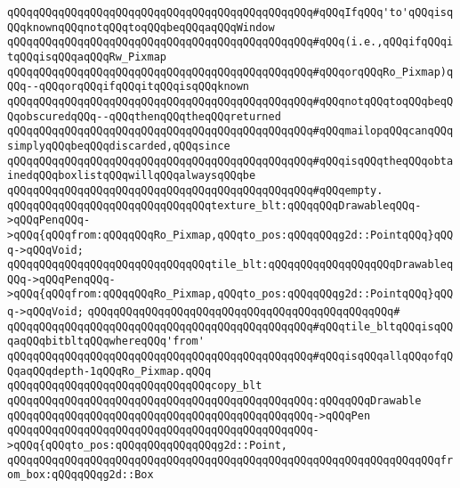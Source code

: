 \verb|qQQqqQQqqQQqqQQqqQQqqQQqqQQqqQQqqQQqqQQqqQQqqQQq#qQQqIfqQQq'to'qQQqisqQQqknownqQQqnotqQQqtoqQQqbeqQQqaqQQqWindow|\newline
\verb|qQQqqQQqqQQqqQQqqQQqqQQqqQQqqQQqqQQqqQQqqQQqqQQq#qQQq(i.e.,qQQqifqQQqitqQQqisqQQqaqQQqRw_Pixmap|\newline
\verb|qQQqqQQqqQQqqQQqqQQqqQQqqQQqqQQqqQQqqQQqqQQqqQQq#qQQqorqQQqRo_Pixmap)qQQq--qQQqorqQQqifqQQqitqQQqisqQQqknown|\newline
\verb|qQQqqQQqqQQqqQQqqQQqqQQqqQQqqQQqqQQqqQQqqQQqqQQq#qQQqnotqQQqtoqQQqbeqQQqobscuredqQQq--qQQqthenqQQqtheqQQqreturned|\newline
\verb|qQQqqQQqqQQqqQQqqQQqqQQqqQQqqQQqqQQqqQQqqQQqqQQq#qQQqmailopqQQqcanqQQqsimplyqQQqbeqQQqdiscarded,qQQqsince|\newline
\verb|qQQqqQQqqQQqqQQqqQQqqQQqqQQqqQQqqQQqqQQqqQQqqQQq#qQQqisqQQqtheqQQqobtainedqQQqboxlistqQQqwillqQQqalwaysqQQqbe|\newline
\verb|qQQqqQQqqQQqqQQqqQQqqQQqqQQqqQQqqQQqqQQqqQQqqQQq#qQQqempty.|\newline
\newline
\newline
\verb|qQQqqQQqqQQqqQQqqQQqqQQqqQQqqQQqtexture_blt:qQQqqQQqDrawableqQQq->qQQqPenqQQq->qQQq{qQQqfrom:qQQqqQQqRo_Pixmap,qQQqto_pos:qQQqqQQqg2d::PointqQQq}qQQq->qQQqVoid;|\newline
\verb|qQQqqQQqqQQqqQQqqQQqqQQqqQQqqQQqtile_blt:qQQqqQQqqQQqqQQqqQQqDrawableqQQq->qQQqPenqQQq->qQQq{qQQqfrom:qQQqqQQqRo_Pixmap,qQQqto_pos:qQQqqQQqg2d::PointqQQq}qQQq->qQQqVoid;|\newline
\verb|qQQqqQQqqQQqqQQqqQQqqQQqqQQqqQQqqQQqqQQqqQQqqQQq#|\newline
\verb|qQQqqQQqqQQqqQQqqQQqqQQqqQQqqQQqqQQqqQQqqQQqqQQq#qQQqtile_bltqQQqisqQQqaqQQqbitbltqQQqwhereqQQq'from'|\newline
\verb|qQQqqQQqqQQqqQQqqQQqqQQqqQQqqQQqqQQqqQQqqQQqqQQq#qQQqisqQQqallqQQqofqQQqaqQQqdepth-1qQQqRo_Pixmap.qQQq|\newline
\newline
\verb|qQQqqQQqqQQqqQQqqQQqqQQqqQQqqQQqcopy_blt|\newline
\verb|qQQqqQQqqQQqqQQqqQQqqQQqqQQqqQQqqQQqqQQqqQQqqQQq:qQQqqQQqDrawable|\newline
\verb|qQQqqQQqqQQqqQQqqQQqqQQqqQQqqQQqqQQqqQQqqQQqqQQq->qQQqPen|\newline
\verb|qQQqqQQqqQQqqQQqqQQqqQQqqQQqqQQqqQQqqQQqqQQqqQQq->qQQq{qQQqto_pos:qQQqqQQqqQQqqQQqg2d::Point,|\newline
\verb|qQQqqQQqqQQqqQQqqQQqqQQqqQQqqQQqqQQqqQQqqQQqqQQqqQQqqQQqqQQqqQQqqQQqfrom_box:qQQqqQQqg2d::Box|\newline
